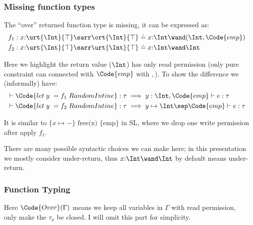\begin{frame}[fragile]
    \frametitle{Missing function types}   

The ``over'' returned function type is missing, it can be expressed as:
\begin{align*}
    &f_1: x{:}\urt{\Int}{\top} \sarr \ort{\Int}{\top} \doteq x{:}\Int \wand (\Int, \Code{emp})
    \\&f_2: x{:}\urt{\Int}{\top} \sarr \urt{\Int}{\top} \doteq x{:}\Int \wand \Int
\end{align*}

Here we highlight the return value ($\Int$) has only read permission (only pure constraint can connected with $\Code{emp}$ with $,$). To show the difference we (informally) have:
\begin{align*}
    &\vdash \Code{let\;y\;=f_1\;RandomInt in e} : \tau \implies y:\Int, \Code{emp} \vdash e : \tau
    \\&\vdash \Code{let\;y\;=f_2\;RandomInt in e} : \tau \implies y\mapsto\Int \sep \Code{emp} \vdash e : \tau
\end{align*}

It is similar to $\{x \mapsto -\} \text{ free(x) } \{\text{emp}\}$ in SL, where we drop one write permission after apply $f_1$.

There are many possible syntactic choices we can make here; in this presentation we mostly consider under-return, thus $x{:}\Int \wand \Int$ by default means under-return.

\end{frame}

\begin{frame}[fragile]
    \frametitle{Function Typing}   

    \begin{figure}[!ht]
    \quad
    \end{figure}

Here $\Code{Over}(\Gamma)$ means we keep all variables in $\Gamma$ with read permission, only make the $\tau_x$ be closed. I will omit this part for simplicity.
\end{frame}

